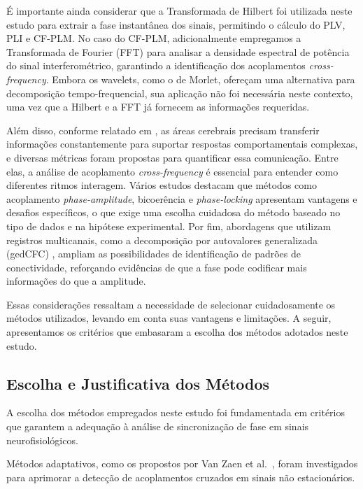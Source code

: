 É importante ainda considerar que a Transformada de Hilbert foi utilizada neste estudo para extrair a fase instantânea dos sinais, permitindo o cálculo do PLV, PLI e CF-PLM. No caso do CF-PLM, adicionalmente empregamos a Transformada de Fourier (FFT) para analisar a densidade espectral de potência do sinal interferométrico, garantindo a identificação dos acoplamentos \textit{cross-frequency}. Embora os wavelets, como o de Morlet, ofereçam uma alternativa para decomposição tempo-frequencial, sua aplicação não foi necessária neste contexto, uma vez que a Hilbert e a FFT já fornecem as informações requeridas.

Além disso, conforme relatado em \cite{sorrentino2022detection}, as áreas cerebrais precisam transferir informações constantemente para suportar respostas comportamentais complexas, e diversas métricas foram propostas para quantificar essa comunicação. Entre elas, a análise de acoplamento \textit{cross-frequency} é essencial para entender como diferentes ritmos interagem. Vários estudos \cite{hulsemann2019quantification} destacam que métodos como acoplamento \textit{phase-amplitude}, bicoerência e \textit{phase-locking} apresentam vantagens e desafios específicos, o que exige uma escolha cuidadosa do método baseado no tipo de dados e na hipótese experimental. Por fim, abordagens que utilizam registros multicanais, como a decomposição por autovalores generalizada (gedCFC) \cite{cohen2017where}, ampliam as possibilidades de identificação de padrões de conectividade, reforçando evidências de que a fase pode codificar mais informações do que a amplitude.

Essas considerações ressaltam a necessidade de selecionar cuidadosamente os métodos utilizados, levando em conta suas vantagens e limitações. A seguir, apresentamos os critérios que embasaram a escolha dos métodos adotados neste estudo.

\subsection{Escolha e Justificativa dos Métodos}

A escolha dos métodos empregados neste estudo foi fundamentada em critérios que garantem a adequação à análise de sincronização de fase em sinais neurofisiológicos.

Métodos adaptativos, como os propostos por Van Zaen et al.~\cite{vanzaen2013adaptive}, foram investigados para aprimorar a detecção de acoplamentos cruzados em sinais não estacionários.


